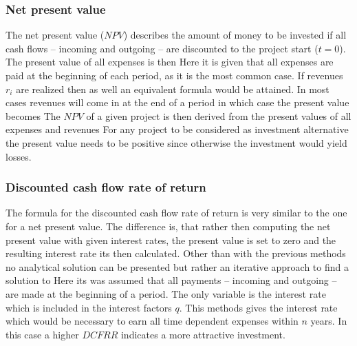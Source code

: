         \subsubsection{Net present value}
            The net present value ($NPV$) describes the amount of money to be invested if all cash flows --
            incoming and outgoing -- are discounted to the project start ($t = 0$). The present value of
            all expenses is then
            Here it is given that all expenses are paid at the beginning of each period, as it is the most common case.
            If revenues $r_i$ are realized then as well an equivalent formula would be attained. In most cases
            revenues will come in at the end of a period in which case the present value becomes
            The $NPV$ of a given project is then derived from the present values of all expenses and revenues
            For any project to be considered as investment alternative the present value needs to be positive since
            otherwise the investment would yield losses.

        \subsubsection{Discounted cash flow rate of return}
            The formula for the discounted cash flow rate of return is very similar to the one for a net present value.
            The difference is, that rather then computing the net present value with given interest rates, the present
            value is set to zero and the resulting interest rate its then calculated. Other than with the previous methods
            no analytical solution can be presented but rather an iterative approach to find a solution to
            Here its was assumed that all payments -- incoming and outgoing -- are made at the beginning of a period.
            The only variable is the interest rate which is included in the interest factors $q$. This methods gives
            the interest rate which would be necessary to earn all time dependent expenses within $n$ years. In this
            case a higher $DCFRR$ indicates a more attractive investment.

